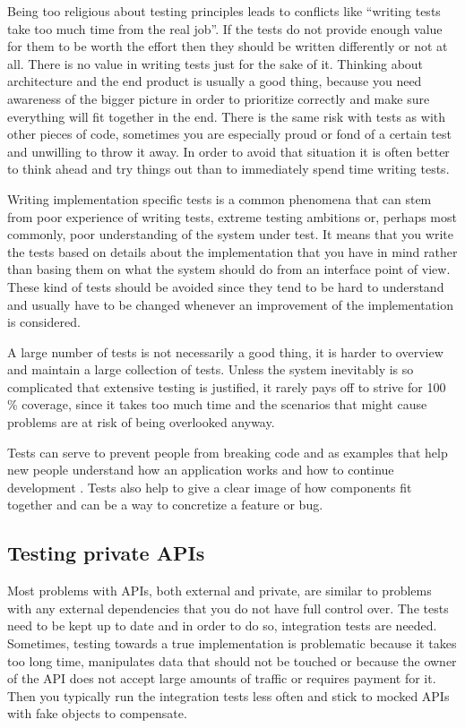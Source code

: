 \documentclass[11pt]{article}
\begin{document}
Being too religious about testing principles leads to conflicts like ``writing tests take too much time from the real job''. If the tests do not provide enough value for them to be worth the effort then they should be written differently or not at all. There is no value in writing tests just for the sake of it. Thinking about architecture and the end product is usually a good thing, because you need awareness of the bigger picture in order to prioritize correctly and make sure everything will fit together in the end. There is the same risk with tests as with other pieces of code, sometimes you are especially proud or fond of a certain test and unwilling to throw it away. In order to avoid that situation it is often better to think ahead and try things out than to immediately spend time writing tests. \cite[question~27]{Edelstam}

Writing implementation specific tests is a common phenomena that can stem from poor experience of writing tests, extreme testing ambitions or, perhaps most commonly, poor understanding of the system under test. It means that you write the tests based on details about the implementation that you have in mind rather than basing them on what the system should do from an interface point of view. These kind of tests should be avoided since they tend to be hard to understand and usually have to be changed whenever an improvement of the implementation is considered.

A large number of tests is not necessarily a good thing, it is harder to overview and maintain a large collection of tests. Unless the system inevitably is so complicated that extensive testing is justified, it rarely pays off to strive for 100 \% coverage, since it takes too much time and the scenarios that might cause problems are at risk of being overlooked anyway. \cite[question~28]{Edelstam}

Tests can serve to prevent people from breaking code and as examples that help new people understand how an application works and how to continue development \cite[questions~31-32]{Edelstam}. Tests also help to give a clear image of how components fit together and can be a way to concretize a feature or bug.

\subsection{Testing private APIs}

Most problems with APIs, both external and private, are similar to problems with any external dependencies that you do not have full control over. The tests need to be kept up to date and in order to do so, integration tests are needed. Sometimes, testing towards a true implementation is problematic because it takes too long time, manipulates data that should not be touched or because the owner of the API does not accept large amounts of traffic or requires payment for it. Then you typically run the integration tests less often and stick to mocked APIs with fake objects to compensate. \cite[questions~19-20]{Stenmark}
\end{document}
